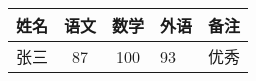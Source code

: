 \documentclass{ctexart}%
\begin{document}
	\begin{tabular}{l|| c |c| p{1.5cm}| r}	
		\hline	%
		姓名&语文&数学&外语&备注\\
		\hline \hline	%
		张三&87&100&93&优秀\\
		\hline 
		
	\end{tabular}
\end{document}
